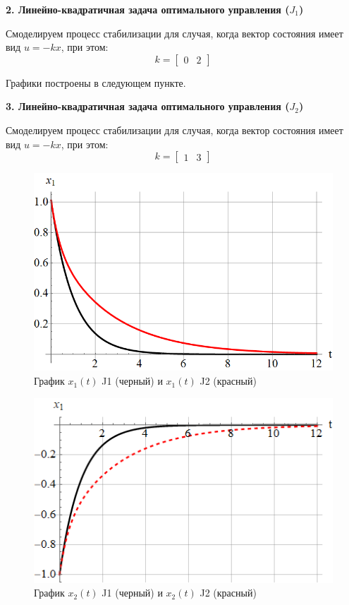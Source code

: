 \newpage

\textbf{2. Линейно-квадратичная задача оптимального управления ($ J_1 $)}

Смоделируем процесс стабилизации для случая, когда вектор состояния имеет вид $ u=-kx $, при этом:
$$
k = \begin{bmatrix} 0 & 2 \end{bmatrix}
$$

Графики построены в следующем пункте.

\textbf{3. Линейно-квадратичная задача оптимального управления ($ J_2 $)}

Смоделируем процесс стабилизации для случая, когда вектор состояния имеет вид $ u=-kx $, при этом:
$$
k = \begin{bmatrix} 1 & 3 \end{bmatrix}
$$

\begin{figure}[h]
    \centering
    \includegraphics[scale=0.4]{chapter_x6/fig3.png}
    \caption{График $ x_1(t) $ J1 (черный) и $ x_1(t) $ J2 (красный) }
    \label{}
\end{figure}

\begin{figure}[h]
    \centering
    \includegraphics[scale=0.7]{chapter_x6/fig4.png}
    \caption{График $ x_2(t) $ J1 (черный) и $ x_2(t) $ J2 (красный) }
    \label{}
\end{figure}

